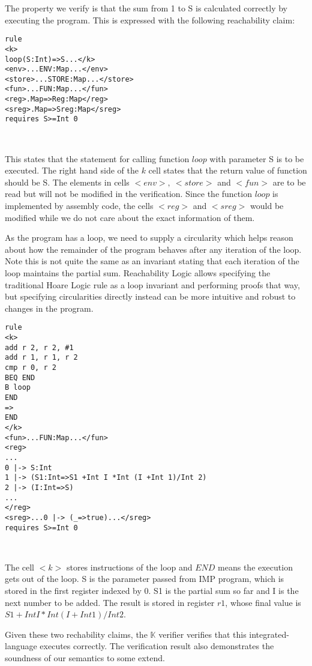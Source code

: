 \documentclass[conference]{IEEEtran}
\begin{document}
\par The property we verify is that the sum from 1 to S is calculated correctly by executing the program. This is expressed with the following reachability claim:

\lstset{style=k}
\begin{minipage}{0.7\textwidth}
\begin{BVerbatim}
rule
<k>
loop(S:Int)=>S...</k>
<env>...ENV:Map...</env>
<store>...STORE:Map...</store>
<fun>...FUN:Map...</fun>
<reg>.Map=>Reg:Map</reg>
<sreg>.Map=>Sreg:Map</sreg>
requires S>=Int 0
\end{BVerbatim}
\end{minipage}\\

\par This states that the statement for calling function $loop$ with parameter S is to be executed. The right hand side of the $k$ cell states that the return value of function should be S. The elements in cells $<env>,~<store>$ and $<fun>$ are to be read but will not be modified in the verification. Since the function $loop$ is implemented by assembly code, the cells $<reg>$ and $<sreg>$ would be modified while we do not care about the exact information of them.
\par As the program has a loop, we need to supply a circularity which helps
reason about how the remainder of the program behaves after any iteration of the loop. Note this is not quite
the same as an invariant stating that each iteration of the loop maintains the partial sum. Reachability Logic allows specifying the traditional Hoare Logic rule as a loop invariant and performing proofs that way, but specifying circularities directly instead can be more intuitive and robust to changes in the program.\\

\lstset{style=k}
\begin{minipage}{0.35\textwidth}
\begin{BVerbatim}
rule
<k>
add r 2, r 2, #1
add r 1, r 1, r 2
cmp r 0, r 2
BEQ END
B loop
END
=>
END
</k>
<fun>...FUN:Map...</fun>
<reg>
...
0 |-> S:Int
1 |-> (S1:Int=>S1 +Int I *Int (I +Int 1)/Int 2)
2 |-> (I:Int=>S)
...
</reg>
<sreg>...0 |-> (_=>true)...</sreg>
requires S>=Int 0
\end{BVerbatim}
\end{minipage}\\

\par The cell $<k>$ stores instructions of the loop and $END$ means the execution gets out of the loop. S is the parameter passed from IMP program, which is stored in the first register indexed by 0. S1 is the partial sum so far and I is the next number to be added. The result is stored in register $r1$, whose final value is $S1 +Int I *Int (I +Int 1)/Int 2$.
\par Given these two rechability claims, the $\mathbb{K}$ verifier verifies that this integrated-language executes correctly. The verification result also demonstrates the soundness of our semantics to some extend.
\end{document}
